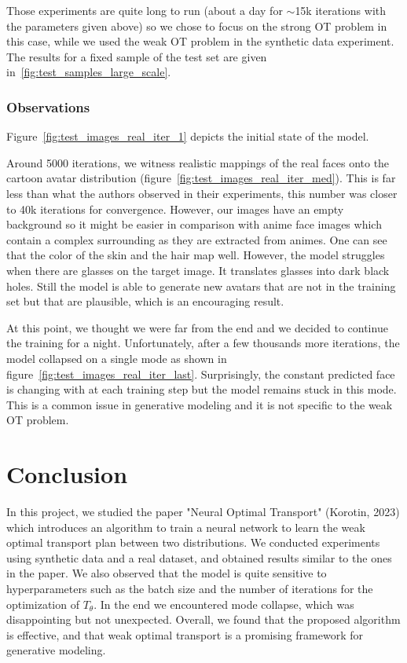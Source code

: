 \documentclass[11pt]{article}
\begin{document}
Those experiments are quite long to run (about a day for $\sim$15k iterations with the parameters given above) so we chose to focus on the strong OT problem in this case, while we used the weak OT problem in the synthetic data experiment. The results for a fixed sample of the test set are given in~\ref{fig:test_samples_large_scale}.

\subsubsection{Observations}

Figure~\ref{fig:test_images_real_iter_1} depicts the initial state of the model.

Around 5000 iterations, we witness realistic mappings of the real faces onto the cartoon avatar distribution (figure~\ref{fig:test_images_real_iter_med}). This is far less than what the authors observed in their experiments, this number was closer to 40k iterations for convergence. However, our images have an empty background so it might be easier in comparison with anime face images which contain a complex surrounding as they are extracted from animes. One can see that the color of the skin and the hair map well. However, the model struggles when there are glasses on the target image. It translates glasses into dark black holes. Still the model is able to generate new avatars that are not in the training set but that are plausible, which is an encouraging result.

At this point, we thought we were far from the end and we decided to continue the training for a night. Unfortunately, after a few thousands more iterations, the model collapsed on a single mode as shown in figure~\ref{fig:test_images_real_iter_last}. Surprisingly, the constant predicted face is changing with at each training step but the model remains stuck in this mode. This is a common issue in generative modeling and it is not specific to the weak OT problem.

\section{Conclusion}

In this project, we studied the paper "Neural Optimal Transport" (Korotin, 2023) \cite{korotin-2022} which introduces an algorithm to train a neural network to learn the weak optimal transport plan between two distributions. We conducted experiments using synthetic data and a real dataset, and obtained results similar to the ones in the paper. We also observed that the model is quite sensitive to hyperparameters such as the batch size and the number of iterations for the optimization of $T_\theta$. In the end we encountered mode collapse, which was disappointing but not unexpected. Overall, we found that the proposed algorithm is effective, and that weak optimal transport is a promising framework for generative modeling.

\newpage

\end{document}
